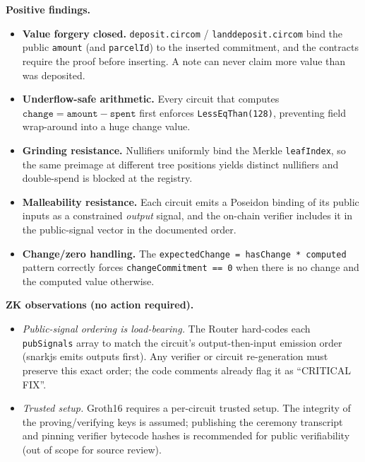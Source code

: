 \documentclass[11pt,a4paper]{article}
\begin{document}
\textbf{Positive findings.}
\begin{itemize}[leftmargin=1.4em,itemsep=2pt]
  \item \textbf{Value forgery closed.} \texttt{deposit.circom} /
    \texttt{landdeposit.circom} bind the public \texttt{amount} (and \texttt{parcelId})
    to the inserted commitment, and the contracts require the proof before
    inserting. A note can never claim more value than was deposited.
  \item \textbf{Underflow-safe arithmetic.} Every circuit that computes
    $\texttt{change} = \texttt{amount} - \texttt{spent}$ first enforces
    \texttt{LessEqThan(128)}, preventing field wrap-around into a huge change value.
  \item \textbf{Grinding resistance.} Nullifiers uniformly bind the Merkle
    \texttt{leafIndex}, so the same preimage at different tree positions yields
    distinct nullifiers and double-spend is blocked at the registry.
  \item \textbf{Malleability resistance.} Each circuit emits a Poseidon binding of
    its public inputs as a constrained \emph{output} signal, and the on-chain
    verifier includes it in the public-signal vector in the documented order.
  \item \textbf{Change/zero handling.} The
    \texttt{expectedChange = hasChange * computed} pattern correctly forces
    \texttt{changeCommitment == 0} when there is no change and the computed value
    otherwise.
\end{itemize}

\textbf{ZK observations (no action required).}
\begin{itemize}[leftmargin=1.4em,itemsep=2pt]
  \item \emph{Public-signal ordering is load-bearing.} The Router hard-codes each
    \texttt{pubSignals} array to match the circuit's output-then-input emission
    order (snarkjs emits outputs first). Any verifier or circuit re-generation must
    preserve this exact order; the code comments already flag it as ``CRITICAL FIX''.
  \item \emph{Trusted setup.} Groth16 requires a per-circuit trusted setup. The
    integrity of the proving/verifying keys is assumed; publishing the ceremony
    transcript and pinning verifier bytecode hashes is recommended for public
    verifiability (out of scope for source review).
\end{itemize}

\end{document}

